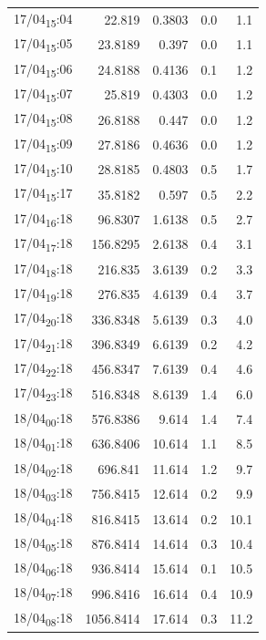\documentclass[11pt]{article}
\begin{document}
\begin{center}
\begin{tabular}{lrrrr}
17/04\textsubscript{15}:04 & 22.819 & 0.3803 & 0.0 & 1.1\\[0pt]
17/04\textsubscript{15}:05 & 23.8189 & 0.397 & 0.0 & 1.1\\[0pt]
17/04\textsubscript{15}:06 & 24.8188 & 0.4136 & 0.1 & 1.2\\[0pt]
17/04\textsubscript{15}:07 & 25.819 & 0.4303 & 0.0 & 1.2\\[0pt]
17/04\textsubscript{15}:08 & 26.8188 & 0.447 & 0.0 & 1.2\\[0pt]
17/04\textsubscript{15}:09 & 27.8186 & 0.4636 & 0.0 & 1.2\\[0pt]
17/04\textsubscript{15}:10 & 28.8185 & 0.4803 & 0.5 & 1.7\\[0pt]
17/04\textsubscript{15}:17 & 35.8182 & 0.597 & 0.5 & 2.2\\[0pt]
17/04\textsubscript{16}:18 & 96.8307 & 1.6138 & 0.5 & 2.7\\[0pt]
17/04\textsubscript{17}:18 & 156.8295 & 2.6138 & 0.4 & 3.1\\[0pt]
17/04\textsubscript{18}:18 & 216.835 & 3.6139 & 0.2 & 3.3\\[0pt]
17/04\textsubscript{19}:18 & 276.835 & 4.6139 & 0.4 & 3.7\\[0pt]
17/04\textsubscript{20}:18 & 336.8348 & 5.6139 & 0.3 & 4.0\\[0pt]
17/04\textsubscript{21}:18 & 396.8349 & 6.6139 & 0.2 & 4.2\\[0pt]
17/04\textsubscript{22}:18 & 456.8347 & 7.6139 & 0.4 & 4.6\\[0pt]
17/04\textsubscript{23}:18 & 516.8348 & 8.6139 & 1.4 & 6.0\\[0pt]
18/04\textsubscript{00}:18 & 576.8386 & 9.614 & 1.4 & 7.4\\[0pt]
18/04\textsubscript{01}:18 & 636.8406 & 10.614 & 1.1 & 8.5\\[0pt]
18/04\textsubscript{02}:18 & 696.841 & 11.614 & 1.2 & 9.7\\[0pt]
18/04\textsubscript{03}:18 & 756.8415 & 12.614 & 0.2 & 9.9\\[0pt]
18/04\textsubscript{04}:18 & 816.8415 & 13.614 & 0.2 & 10.1\\[0pt]
18/04\textsubscript{05}:18 & 876.8414 & 14.614 & 0.3 & 10.4\\[0pt]
18/04\textsubscript{06}:18 & 936.8414 & 15.614 & 0.1 & 10.5\\[0pt]
18/04\textsubscript{07}:18 & 996.8416 & 16.614 & 0.4 & 10.9\\[0pt]
18/04\textsubscript{08}:18 & 1056.8414 & 17.614 & 0.3 & 11.2\\[0pt]

\end{tabular}
\end{center}
\end{document}
